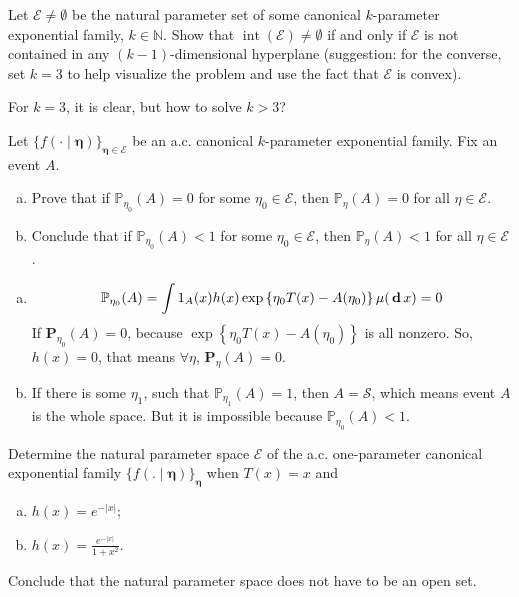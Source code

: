 \begin{exercise}
    Let \(\mathcal{E} \neq \emptyset\) be the natural parameter set of some canonical \(k\)-parameter exponential family, \(k \in \mathbb{N}\). Show that \(\operatorname{int}(\mathcal{E}) \neq \emptyset\) if and only if \(\mathcal{E}\) is not contained in any \((k-1)\)-dimensional hyperplane (suggestion: for the converse, set \(k=3\) to help visualize the problem and use the fact that \(\mathcal{E}\) is convex).
\end{exercise}

\begin{solution}
    For $k=3$, it is clear, but how to solve $k>3$? 
\end{solution}

\begin{exercise}
    Let \(\{f(\cdot \mid \boldsymbol{\eta})\}_{\boldsymbol{\eta} \in \mathcal{E}}\) be an a.c. canonical \(k\)-parameter exponential family. Fix an event \(A\). 
    \begin{enumerate}[(a)]
        \item Prove that if \(\mathbb{P}_{\eta_{0}}(A)=0\) for some \(\eta_{0} \in \mathcal{E}\), then \(\mathbb{P}_{\eta}(A)=0\) for all \(\eta \in \mathcal{E}\). 
        \item Conclude that if \(\mathbb{P}_{\eta_{0}}(A)<1\) for some \(\eta_{0} \in \mathcal{E}\), then \(\mathbb{P}_{\eta}(A)<1\) for all \(\eta \in \mathcal{E}\).
    \end{enumerate}
\end{exercise}

\begin{solution}
    \begin{enumerate}[(a)]
        \item \[\mathbb{P}_{\eta_0}(A)=\int1_{A}(x)h(x)\exp\left\{\eta_0T(x)-A(\eta_0)\right\}\mu(\,\mathbf{d}\, x)=0\]
        If $\mathbf{P}_{\eta_0}(A)=0$, because $\exp\left\{\eta_0T(x)-A(\eta_0)\right\}$ is all nonzero. So, $h(x)=0$, that means $\forall \eta$, $\mathbf{P}_{\eta}(A)=0$. 
        \item If there is some $\eta_1$, such that $\mathbb{P}_{\eta_1}(A)=1$, then $A=\mathcal{S}$, which means event $A$ is the whole space. But it is impossible because $\mathbb{P}_{\eta_0}(A)<1$. 
    \end{enumerate}
\end{solution}

\begin{exercise}
    Determine the natural parameter space \(\mathcal{E}\) of the a.c. one-parameter canonical exponential family \(\{f(. \mid \boldsymbol{\eta})\}_{\boldsymbol{\eta}}\) when \(T(x)=x\) and
    \begin{enumerate}[(a)]
        \item \(h(x)=e^{-|x|}\);
        \item \(h(x)=\frac{e^{-|x|}}{1+x^{2}}\).
    \end{enumerate}
    Conclude that the natural parameter space does not have to be an open set.
\end{exercise}

